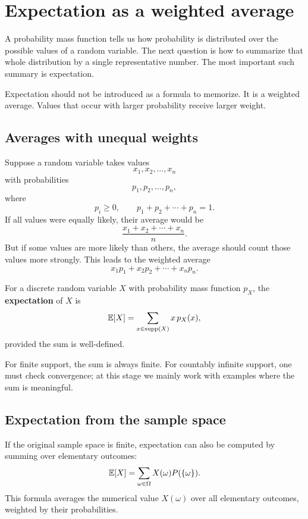 \section{Expectation as a weighted average}

A probability mass function tells us how probability is distributed over the
possible values of a random variable. The next question is how to summarize that
whole distribution by a single representative number. The most important such
summary is expectation.

Expectation should not be introduced as a formula to memorize. It is a weighted
average. Values that occur with larger probability receive larger weight.

\subsection*{Averages with unequal weights}

Suppose a random variable takes values
\[
x_1,x_2,\ldots,x_n
\]
with probabilities
\[
p_1,p_2,\ldots,p_n,
\]
where
\[
p_i\geq 0,\qquad p_1+p_2+\cdots+p_n=1.
\]
If all values were equally likely, their average would be
\[
\frac{x_1+x_2+\cdots+x_n}{n}.
\]
But if some values are more likely than others, the average should count those
values more strongly. This leads to the weighted average
\[
x_1p_1+x_2p_2+\cdots+x_np_n.
\]

\begin{definitionbox}
For a discrete random variable \(X\) with probability mass function \(p_X\), the
\textbf{expectation} of \(X\) is
\[
\mathbb{E}[X]=\sum_{x\in\operatorname{supp}(X)}x\,p_X(x),
\]
provided the sum is well-defined.
\end{definitionbox}

For finite support, the sum is always finite. For countably infinite support,
one must check convergence; at this stage we mainly work with examples where the
sum is meaningful.

\subsection*{Expectation from the sample space}

If the original sample space is finite, expectation can also be computed by
summing over elementary outcomes:
\[
\mathbb{E}[X]=\sum_{\omega\in\Omega}X(\omega)P(\{\omega\}).
\]
This formula averages the numerical value \(X(\omega)\) over all elementary
outcomes, weighted by their probabilities.

